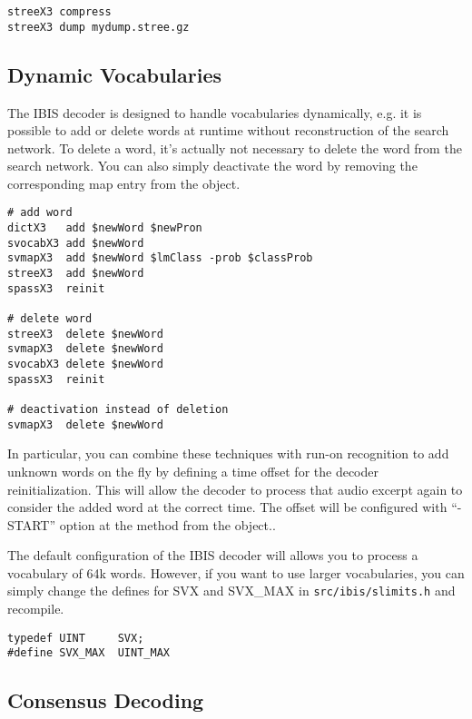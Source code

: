 \begin{verbatim}
streeX3 compress
streeX3 dump mydump.stree.gz
\end{verbatim}


\subsection{Dynamic Vocabularies}

The IBIS decoder is designed  to handle vocabularies dynamically, e.g.
it    is possible  to   add   or   delete words  at  runtime   without
reconstruction of the search network.  To delete a word, it's actually
not necessary to delete the word from the search network. You can also
simply deactivate the word   by removing the corresponding  map  entry
from the  object.

\begin{verbatim}
# add word
dictX3   add $newWord $newPron
svocabX3 add $newWord
svmapX3  add $newWord $lmClass -prob $classProb
streeX3  add $newWord
spassX3  reinit

# delete word
streeX3  delete $newWord
svmapX3  delete $newWord
svocabX3 delete $newWord
spassX3  reinit

# deactivation instead of deletion
svmapX3  delete $newWord
\end{verbatim}

In  particular,   you  can   combine   these  techniques   with run-on
recognition to add unknown words on the fly by  defining a time offset
for   the decoder reinitialization.  This  will  allow  the decoder to
process that audio excerpt again  to  consider the  added word at  the
correct time.  The offset will be configured with ``-START'' option at
the  method from the  object..

The default   configuration of the IBIS  decoder   will allows  you to
process a vocabulary   of 64k words.  However,  if you want  to  use
larger vocabularies,  you can  simply change the   defines for SVX and
SVX\_MAX in \texttt{src/ibis/slimits.h} and recompile.

\begin{verbatim}
typedef UINT     SVX;          
#define SVX_MAX  UINT_MAX
\end{verbatim}


\subsection{Consensus Decoding}

